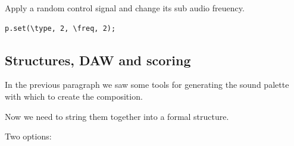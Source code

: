 Apply a random control signal and change its sub audio freuency.

\begin{lstlisting}[frame=single] 
p.set(\type, 2, \freq, 2);
\end{lstlisting}

\subsection{Structures, DAW and scoring}\label{structures-daw-and-scoring}

In the previous paragraph we saw some tools for generating the sound palette with which to create the composition.

Now we need to string them together into a formal structure.

Two options:


